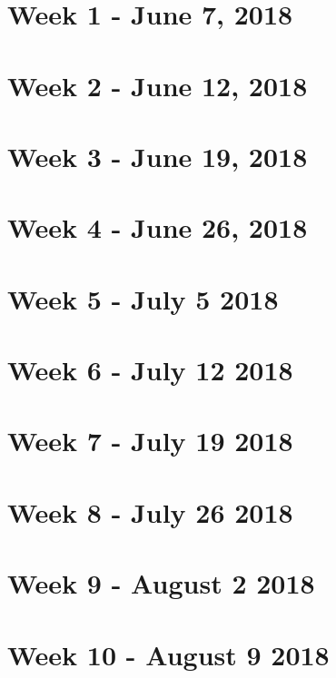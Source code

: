\documentclass[a4paper]{report}
\begin{document}


\tableofcontents

\iffalse
\fi
\chapter{Week 1 - June 7, 2018}


\chapter{Week 2 - June 12, 2018}


\chapter{Week 3 - June 19, 2018}


\chapter{Week 4 - June 26, 2018}


\chapter{Week 5 - July 5 2018}


\chapter{Week 6 - July 12 2018}


\chapter{Week 7 - July 19 2018}


\chapter{Week 8 - July 26 2018}


\chapter{Week 9 - August 2 2018}


\chapter{Week 10 - August 9 2018}

\end{document}
